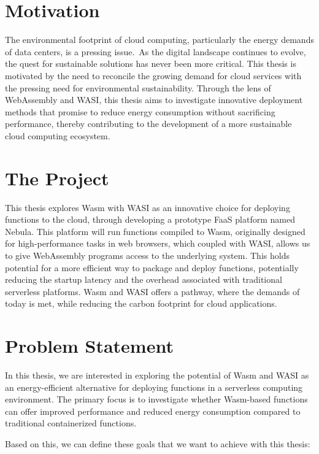 \documentclass[
  table]{report}
\begin{document}
\section{Motivation}
\label{sect:motivation}

The environmental footprint of cloud computing, particularly the energy
demands of data centers, is a pressing issue.~As the digital landscape
continues to evolve, the quest for sustainable solutions has never been
more critical. This thesis is motivated by the need to reconcile the
growing demand for cloud services with the pressing need for
environmental sustainability. Through the lens of WebAssembly and
\ac{WASI}, this thesis aims to investigate innovative deployment methods
that promise to reduce energy consumption without sacrificing
performance, thereby contributing to the development of a more
sustainable cloud computing ecosystem.

\section{The Project}
\label{sect:project}

This thesis explores \ac{Wasm} with \ac{WASI} as an innovative choice
for deploying functions to the cloud, through developing a prototype
\ac{FaaS} platform named Nebula. This platform will run functions
compiled to \ac{Wasm}, originally designed for high-performance tasks in
web browsers, which coupled with \ac{WASI}, allows us to give
WebAssembly programs access to the underlying system. This holds
potential for a more efficient way to package and deploy functions,
potentially reducing the startup latency and the overhead associated
with traditional serverless platforms. \ac{Wasm} and \ac{WASI} offers a
pathway, where the demands of today is met, while reducing the carbon
footprint for cloud applications.

\section{Problem Statement}
\label{sect:problems}

In this thesis, we are interested in exploring the potential of
\ac{Wasm} and \ac{WASI} as an energy-efficient alternative for deploying
functions in a serverless computing environment. The primary focus is to
investigate whether \ac{Wasm}-based functions can offer improved
performance and reduced energy consumption compared to traditional
containerized functions.

Based on this, we can define these goals that we want to achieve with
this thesis:
\end{document}
